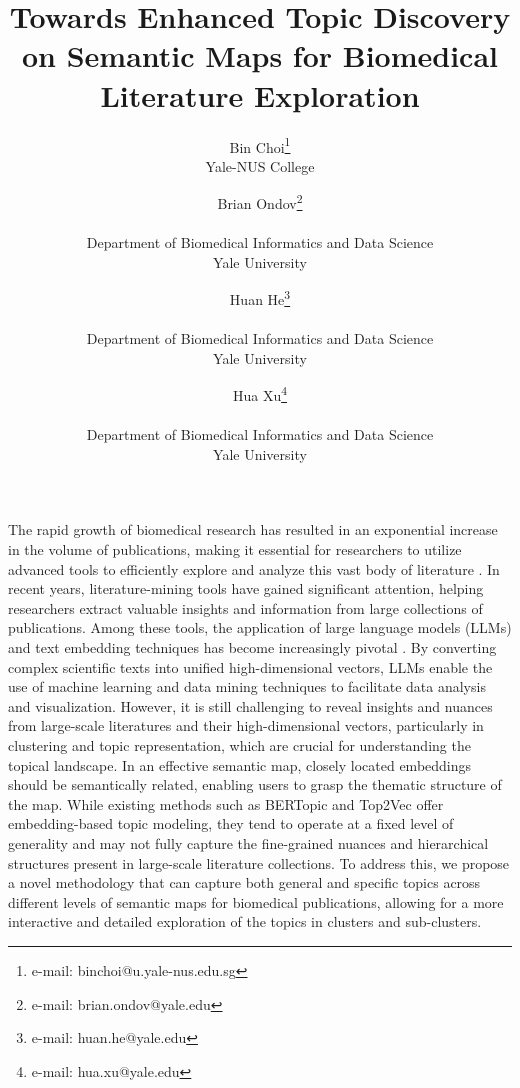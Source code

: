 \documentclass{vgtc}                          %
\title{Towards Enhanced Topic Discovery on Semantic Maps for Biomedical Literature Exploration}
\author{Bin Choi\thanks{e-mail: binchoi@u.yale-nus.edu.sg}\\ %
        \scriptsize Yale-NUS College %
\and Brian Ondov\thanks{e-mail: brian.ondov@yale.edu}\\ %
     \parbox{1.5in}{\scriptsize \centering Department of Biomedical Informatics and Data Science \\ Yale University} %
\and Huan He\thanks{e-mail: huan.he@yale.edu}\\ %
     \parbox{1.5in}{\scriptsize \centering Department of Biomedical Informatics and Data Science \\ Yale University} %
\and Hua Xu\thanks{e-mail: hua.xu@yale.edu}\\ %
     \parbox{1.5in}{\scriptsize \centering Department of Biomedical Informatics and Data Science \\ Yale University} %
}
\begin{document}


\maketitle

The rapid growth of biomedical research has resulted in an exponential increase in the volume of publications, making it essential for researchers to utilize advanced tools to efficiently explore and analyze this vast body of literature \cite{Gonzalez-Marquez2024}. In recent years, literature-mining tools have gained significant attention, helping researchers extract valuable insights and information from large collections of publications. Among these tools, the application of large language models (LLMs) and text embedding techniques has become increasingly pivotal \cite{Simon2024}. By converting complex scientific texts into unified high-dimensional vectors, LLMs enable the use of machine learning and data mining techniques to facilitate data analysis and visualization.
However, it is still challenging to reveal insights and nuances from large-scale literatures and their high-dimensional vectors, particularly in clustering and topic representation, which are crucial for understanding the topical landscape. In an effective semantic map, closely located embeddings should be semantically related, enabling users to grasp the thematic structure of the map. While existing methods such as BERTopic \cite{Grootendorst2022} and Top2Vec \cite{Angelov2020} offer embedding-based topic modeling, they tend to operate at a fixed level of generality and may not fully capture the fine-grained nuances and hierarchical structures present in large-scale literature collections. To address this, we propose a novel methodology that can capture both general and specific topics across different levels of semantic maps for biomedical publications, allowing for a more interactive and detailed exploration of the topics in clusters and sub-clusters.
\end{document}
